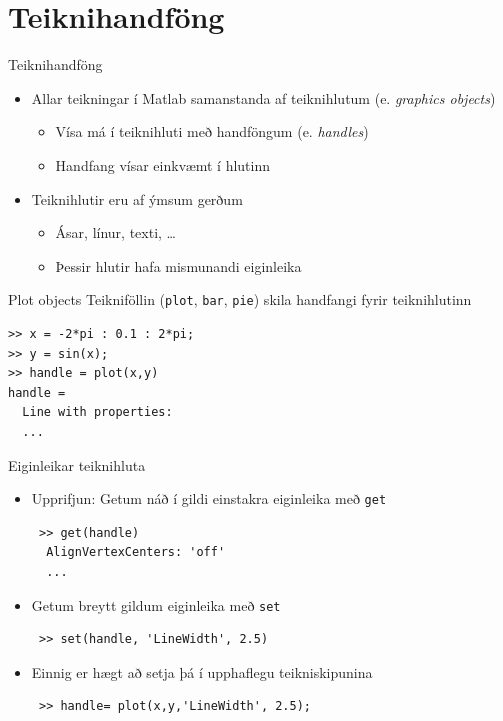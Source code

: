 \documentclass[handout]{beamer}
\begin{document}
\section{Teiknihandföng}

\begin{frame}{Teiknihandföng}
\begin{itemize}
 \item Allar teikningar í Matlab samanstanda af teiknihlutum (e. \emph{graphics objects})
 \begin{itemize}
  \item Vísa má í teiknihluti með handföngum (e. \emph{handles})
  \item Handfang vísar einkvæmt í hlutinn
 \end{itemize}
 \item Teiknihlutir eru af ýmsum gerðum
 \begin{itemize}
  \item Ásar, línur, texti, \ldots
  \item Þessir hlutir hafa mismunandi eiginleika
 \end{itemize}
\end{itemize}
\end{frame}

\begin{frame}[fragile]{Plot objects}
Teikniföllin (\texttt{plot}, \texttt{bar}, \texttt{pie}) skila handfangi fyrir teiknihlutinn
\begin{verbatim}
>> x = -2*pi : 0.1 : 2*pi;
>> y = sin(x);
>> handle = plot(x,y)
handle = 
  Line with properties:
  ...
\end{verbatim}
\end{frame}

\begin{frame}[fragile]{Eiginleikar teiknihluta}
\begin{itemize}
 \item Upprifjun: Getum náð í gildi einstakra eiginleika með \texttt{get}
 \begin{verbatim}
 >> get(handle)
  AlignVertexCenters: 'off'
  ...
 \end{verbatim}
 \item Getum breytt gildum eiginleika með \texttt{set}
 \begin{verbatim}
 >> set(handle, 'LineWidth', 2.5)
 \end{verbatim}
 \item Einnig er hægt að setja þá í upphaflegu teikniskipunina
 \begin{verbatim}
 >> handle= plot(x,y,'LineWidth', 2.5);
 \end{verbatim}
\end{itemize}
\end{frame}
\end{document}
